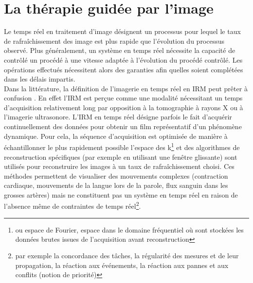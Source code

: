 \documentclass[10pt,a4paper]{report}
\begin{document}
\label{chap1-intro}
\minitoc

\section{La thérapie guidée par l'image}

Le temps réel en traitement d’image désignent un processus pour lequel le taux de rafraîchissement des image est plus rapide que l’évolution du processus observé. Plus généralement, un système en temps réel nécessite la capacité de contrôlé un procédé à une vitesse adaptée à l’évolution du procédé contrôlé. Les opérations effectués nécessitent alors des garanties afin quelles soient complétées dans les délais impartis.\\

Dans la littérature, la définition de l’imagerie en temps réel en \ac{IRM} peut prêter à confusion \cite{dietz2018nomenclature}. En effet l’\ac{IRM} est perçue comme une modalité nécessitant un temps d’acquisition relativement long par opposition à la tomographie à rayons X ou à l’imagerie ultrasonore. L’\ac{IRM} en temps réel désigne parfois le fait d’acquérir continuellement des données pour obtenir un film représentatif d’un phénomène dynamique. Pour cela, la séquence d’acquisition est optimisée de manière à échantillonner le plus rapidement possible l’espace des k\footnote{ou espace de Fourier, espace dans le domaine fréquentiel où sont stockées les données brutes issues de l’acquisition avant reconstruction} et des algorithmes de reconstruction spécifiques (par exemple en utilisant une fenêtre glissante) sont utilisés pour reconstruire les images à un taux de rafraîchissement choisi. Ces méthodes permettent de visualiser des mouvements complexes (contraction cardiaque, mouvements de la langue lors de la parole, flux sanguin dans les grosses artères) mais ne constituent pas un système en temps réel en raison de l’absence même de contraintes de temps réel\footnote{par exemple la concordance des tâches, la régularité des mesures et de leur propagation, la réaction aux événements, la réaction aux pannes et aux conflits (notion de priorité)}.\\
\end{document}
